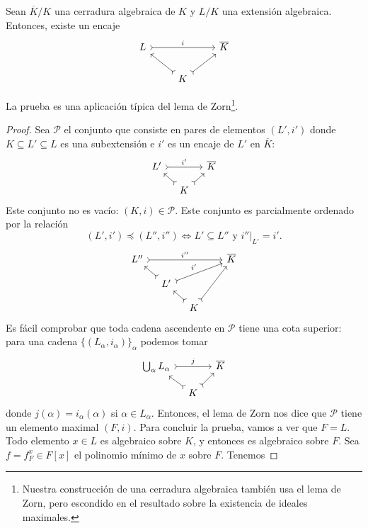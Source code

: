 \begin{lema}
  \label{lema:encajes-en-cerradura-algebraica}
  Sean $\overline{K}/K$ una cerradura algebraica de $K$ y $L/K$ una extensión
  algebraica. Entonces, existe un encaje
  \[ \begin{tikzcd}
    L \ar[>->]{rr}{i} && \overline{K} \\
    & K\ar[>->]{ul}\ar[>->]{ur}
  \end{tikzcd} \]
\end{lema}

La prueba es una aplicación típica del lema de Zorn\footnote{Nuestra
  construcción de una cerradura algebraica también usa el lema de Zorn, pero
  escondido en el resultado sobre la existencia de ideales maximales.}.

\begin{proof}
  Sea $\mathcal{P}$ el conjunto que consiste en pares de elementos $(L',i')$
  donde $K \subseteq L' \subseteq L$ es una subextensión e $i'$ es un encaje de
  $L'$ en $\overline{K}$:
  \[ \begin{tikzcd}[row sep=1em, column sep=1em]
    L' \ar[>->]{rr}{i'} && \overline{K} \\
    & K\ar[>->]{ul}\ar[>->]{ur}
  \end{tikzcd} \]
  Este conjunto no es vacío: $(K,i) \in \mathcal{P}$. Este conjunto es
  parcialmente ordenado por la relación
  $$(L',i') \preceq (L'',i'') \iff L' \subseteq L'' \text{ y } \left.i''\right|_{L'} = i'.$$
  \[ \begin{tikzcd}[row sep=1em, column sep=1em]
    L'' \ar[>->]{rrrr}{i''} &&&& \overline{K} \\
    & L' \ar[>->]{urrr}{i'}\ar[>->]{ul} \\
    && K\ar[>->]{ul}\ar[>->]{uurr}
  \end{tikzcd} \]
  Es fácil comprobar que toda cadena ascendente en $\mathcal{P}$ tiene una cota
  superior: para una cadena $\{ (L_\alpha,i_\alpha) \}_\alpha$ podemos tomar
  \[ \begin{tikzcd}[row sep=1em, column sep=1em]
    \bigcup_\alpha L_\alpha \ar[>->]{rr}{j} && \overline{K} \\
    & K\ar[>->]{ul}\ar[>->]{ur}
  \end{tikzcd} \]
  donde $j (\alpha) = i_\alpha (\alpha)$ si $\alpha \in L_\alpha$.
  Entonces, el lema de Zorn nos dice que $\mathcal{P}$ tiene un elemento maximal
  $(F,i)$. Para concluir la prueba, vamos a ver que $F = L$. Todo elemento
  $x \in L$ es algebraico sobre $K$, y entonces es algebraico sobre $F$. Sea
  $f= f^x_F \in F [x]$ el polinomio mínimo de $x$ sobre $F$. Tenemos

\end{proof}
